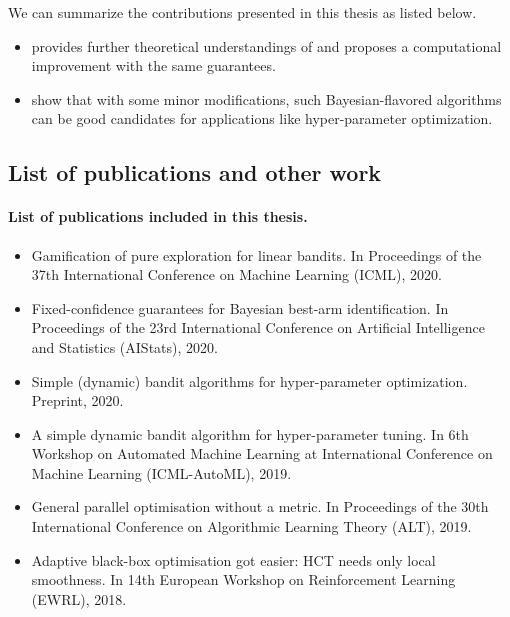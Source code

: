 We can summarize the contributions presented in this thesis as listed below.

\begin{itemize}
    \item \cite{shang2020t3c} provides further theoretical understandings of \TTTS and proposes a computational improvement \TCC with the same guarantees. 
    \item \cite{shang2019dttts} show that with some minor modifications, such Bayesian-flavored algorithms can be good candidates for applications like hyper-parameter optimization.
\end{itemize}

\subsection{List of publications and other work}\label{sec:intro.contributions.list}

\paragraph{List of publications included in this thesis.}

\begin{itemize}
    \item Gamification of pure exploration for linear bandits. In Proceedings of the 37th International Conference on Machine Learning (ICML), 2020.~\citep{degenne2020game}
    \item Fixed-confidence guarantees for Bayesian best-arm identification. In Proceedings of the 23rd International Conference on Artificial Intelligence and Statistics (AIStats), 2020.\citep{shang2020t3c}
    \item Simple (dynamic) bandit algorithms for hyper-parameter optimization. Preprint, 2020.~\citep{shang2020dttts}
    \item A simple dynamic bandit algorithm for hyper-parameter tuning. In 6th Workshop on Automated Machine Learning at International Conference on Machine Learning (ICML-AutoML), 2019.~\citep{shang2019dttts}
    \item General parallel optimisation without a metric. In Proceedings of the 30th International Conference on Algorithmic Learning Theory (ALT), 2019.~\citep{shang2019adaptive}
    \item Adaptive black-box optimisation got easier: HCT needs only local smoothness. In 14th European Workshop on Reinforcement Learning (EWRL), 2018.~\citep{shang2018adaptive}
\end{itemize}

